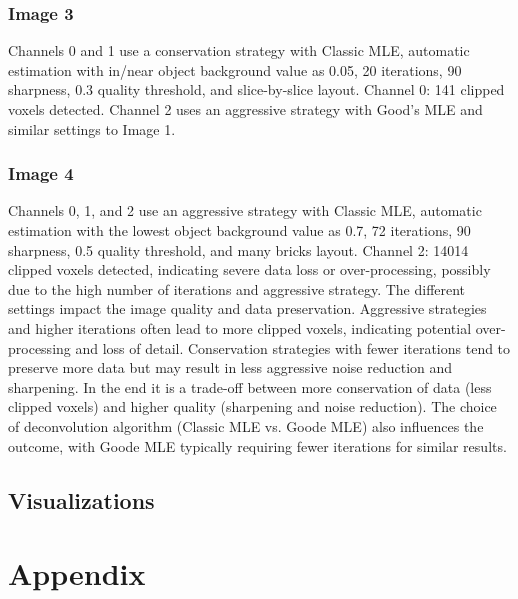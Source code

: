 \documentclass{article}
\begin{document}
\subsubsection*{Image 3} \newline
Channels 0 and 1 use a conservation strategy with Classic MLE, automatic estimation with in/near object background value as 0.05, 20 iterations, 90 sharpness, 0.3 quality threshold, and slice-by-slice layout. \newline
Channel 0: 141 clipped voxels detected. \newline
Channel 2 uses an aggressive strategy with Good's MLE and similar settings to Image 1.\newline
\subsubsection*{Image 4}
Channels 0, 1, and 2 use an aggressive strategy with Classic MLE, automatic estimation with the lowest object background value as 0.7, 72 iterations, 90 sharpness, 0.5 quality threshold, and many bricks layout. \newline
Channel 2: 14014 clipped voxels detected, indicating severe data loss or over-processing, possibly due to the high number of iterations and aggressive strategy. \newline
\newline
The different settings impact the image quality and data preservation. Aggressive strategies and higher iterations often lead to more clipped voxels, indicating potential over-processing and loss of detail. Conservation strategies with fewer iterations tend to preserve more data but may result in less aggressive noise reduction and sharpening. In the end it is a trade-off between more conservation of data (less clipped voxels) and higher quality (sharpening and noise reduction). The choice of deconvolution algorithm (Classic MLE vs. Goode MLE) also influences the outcome, with Goode MLE typically requiring fewer iterations for similar results.



\subsection*{Visualizations}
\clearpage
\section*{Appendix}
\end{document}
